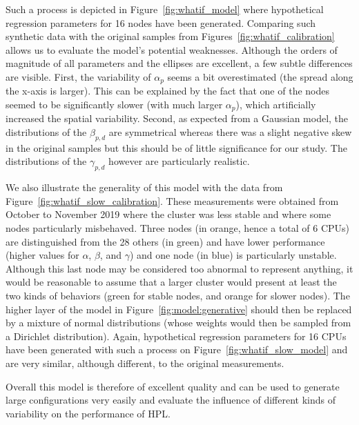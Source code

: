             Such a process is depicted in Figure~\ref{fig:whatif_model} where hypothetical regression parameters for 16
            nodes have been generated. Comparing such synthetic data with the original samples from
            Figures~\ref{fig:whatif_calibration} allows us to evaluate the model's potential weaknesses. Although the
            orders of magnitude of all parameters and the ellipses are excellent, a few subtle differences are visible.
            First, the variability of \(\alpha_{p}\) seems a bit overestimated (the spread along the x-axis is larger).
            This can be explained by the fact that one of the nodes seemed to be significantly slower (with much larger
            \(\alpha_{p}\)), which artificially increased the spatial variability. Second, as expected from a Gaussian
            model, the distributions of the \(\beta_{p,d}\) are symmetrical whereas there was a slight negative skew in
            the original samples but this should be of little significance for our study. The distributions of the
            \(\gamma_{p,d}\) however are particularly realistic.

            We also illustrate the generality of this model with the data from Figure~\ref{fig:whatif_slow_calibration}.
            These measurements were obtained from October to November 2019 where the cluster was less stable and where
            some nodes particularly misbehaved. Three nodes (in orange, hence a total of 6 CPUs) are distinguished from
            the 28 others (in green) and have lower performance (higher values for \(\alpha\), \(\beta\), and
            \(\gamma\)) and one node (in blue) is particularly unstable. Although this last node may be considered too
            abnormal to represent anything, it would be reasonable to assume that a larger cluster would present at
            least the two kinds of behaviors (green for stable nodes, and orange for slower nodes). The higher layer of
            the model in Figure~\ref{fig:model:generative} should then be replaced by a mixture of normal distributions
            (whose weights would then be sampled from a Dirichlet distribution). Again, hypothetical regression
            parameters for 16 CPUs have been generated with such a process on Figure~\ref{fig:whatif_slow_model} and are
            very similar, although different, to the original measurements.

            Overall this model is therefore of excellent quality and can be used to generate large configurations very
            easily and evaluate the influence of different kinds of variability on the performance of HPL.

